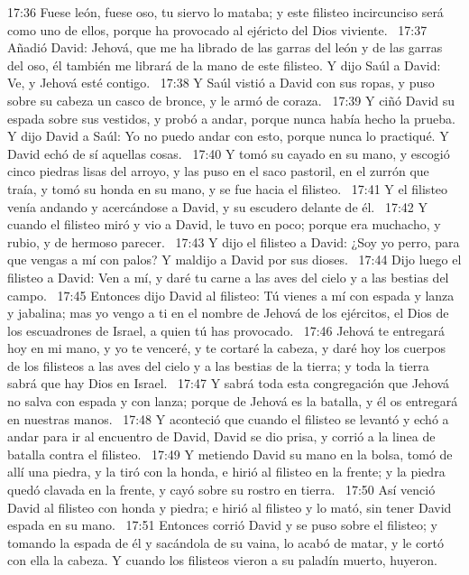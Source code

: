 17:36 Fuese león, fuese oso, tu siervo lo mataba; y este filisteo incircunciso será como uno de ellos, porque ha provocado al ejéricto del Dios viviente.  
17:37 Añadió David: Jehová, que me ha librado de las garras del león y de las garras del oso, él también me librará de la mano de este filisteo. Y dijo Saúl a David: Ve, y Jehová esté contigo.  
17:38 Y Saúl vistió a David con sus ropas, y puso sobre su cabeza un casco de bronce, y le armó de coraza.  
17:39 Y ciñó David su espada sobre sus vestidos, y probó a andar, porque nunca había hecho la prueba. Y dijo David a Saúl: Yo no puedo andar con esto, porque nunca lo practiqué. Y David echó de sí aquellas cosas.  
17:40 Y tomó su cayado en su mano, y escogió cinco piedras lisas del arroyo, y las puso en el saco pastoril, en el zurrón que traía, y tomó su honda en su mano, y se fue hacia el filisteo.  
17:41 Y el filisteo venía andando y acercándose a David, y su escudero delante de él.  
17:42 Y cuando el filisteo miró y vio a David, le tuvo en poco; porque era muchacho, y rubio, y de hermoso parecer.  
17:43 Y dijo el filisteo a David: ¿Soy yo perro, para que vengas a mí con palos? Y maldijo a David por sus dioses.  
17:44 Dijo luego el filisteo a David: Ven a mí, y daré tu carne a las aves del cielo y a las bestias del campo.  
17:45 Entonces dijo David al filisteo: Tú vienes a mí con espada y lanza y jabalina; mas yo vengo a ti en el nombre de Jehová de los ejércitos, el Dios de los escuadrones de Israel, a quien tú has provocado.  
17:46 Jehová te entregará hoy en mi mano, y yo te venceré, y te cortaré la cabeza, y daré hoy los cuerpos de los filisteos a las aves del cielo y a las bestias de la tierra; y toda la tierra sabrá que hay Dios en Israel.  
17:47 Y sabrá toda esta congregación que Jehová no salva con espada y con lanza; porque de Jehová es la batalla, y él os entregará en nuestras manos.  
17:48 Y aconteció que cuando el filisteo se levantó y echó a andar para ir al encuentro de David, David se dio prisa, y corrió a la linea de batalla contra el filisteo.  
17:49 Y metiendo David su mano en la bolsa, tomó de allí una piedra, y la tiró con la honda, e hirió al filisteo en la frente; y la piedra quedó clavada en la frente, y cayó sobre su rostro en tierra.  
17:50 Así venció David al filisteo con honda y piedra; e hirió al filisteo y lo mató, sin tener David espada en su mano.  
17:51 Entonces corrió David y se puso sobre el filisteo; y tomando la espada de él y sacándola de su vaina, lo acabó de matar, y le cortó con ella la cabeza. Y cuando los filisteos vieron a su paladín muerto, huyeron.  
